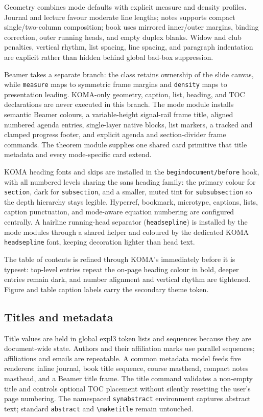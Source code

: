 \documentclass[a4paper,11pt]{scrartcl}
\begin{document}
Geometry combines mode defaults with explicit measure and density profiles.
Journal and lecture favour moderate line lengths; notes supports compact
single/two-column composition; book uses mirrored inner/outer margins, binding
correction, outer running heads, and empty duplex blanks. Widow and club penalties,
vertical rhythm, list spacing, line spacing, and paragraph indentation are
explicit rather than hidden behind global bad-box suppression.

Beamer takes a separate branch: the class retains ownership of the slide
canvas, while \texttt{measure} maps to symmetric frame margins and
\texttt{density} maps to presentation leading. KOMA-only geometry, caption,
list, heading, and TOC declarations are never executed in this branch. The
mode module installs semantic Beamer colours, a variable-height signal-rail
frame title, aligned numbered agenda entries, single-layer native blocks, list
markers, a tracked and clamped progress footer, and explicit agenda and
section-divider frame commands. The theorem module supplies one shared card
primitive that title metadata and every mode-specific card extend.

KOMA heading fonts and skips are installed in the
\texttt{begindocument/before} hook, with all numbered levels sharing the sans
heading family: the primary colour for \texttt{section}, dark for
\texttt{subsection}, and a smaller, muted tint for \texttt{subsubsection} so
the depth hierarchy stays legible. Hyperref, bookmark, microtype, captions,
lists, caption punctuation, and mode-aware equation numbering are configured centrally.
A hairline running-head separator (\texttt{headsepline}) is installed by the
mode modules through a shared helper and coloured by the dedicated KOMA
\texttt{headsepline} font, keeping decoration lighter than head text.

The table of contents is refined through KOMA's \texttt{\string\DeclareTOCStyleEntry}
immediately before it is typeset: top-level entries repeat the on-page heading
colour in bold, deeper entries remain dark, and number alignment and vertical
rhythm are tightened. Figure and table caption labels carry the secondary
theme token.

\subsection{Titles and metadata}

Title values are held in global expl3 token lists and sequences because they
are document-wide state. Authors and their
affiliation marks use parallel sequences; affiliations and emails are
repeatable. A common metadata model feeds five renderers: inline journal,
book title sequence, course masthead, compact notes masthead, and a Beamer
title frame. The title
command validates a non-empty title and controls optional TOC placement without
silently resetting the user's page numbering. The namespaced
\texttt{synabstract} environment captures abstract text; standard
\texttt{abstract} and \verb|\maketitle| remain untouched.
\end{document}
